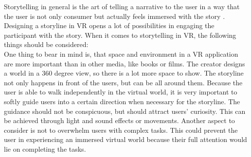 Storytelling in general is the art of telling a narrative to the user in a way that the user is not only consumer but actually feels immersed with the story \cite{Louden.2018}. Designing a storyline in VR opens a lot of possibilities in engaging the participant with the story. When it comes to storytelling in VR, the following things should be considered:\\
One thing to bear in mind is, that space and environment in a VR application are more important than in other media, like books or films. The creator designs a world in a 360 degree view, so there is a lot more space to show. The storyline not only happens in front of the users, but can be all around them. Because the user is able to walk independently in the virtual world, it is very important to softly guide users into a certain direction when necessary for the storyline. The guidance should not be conspicuous, but should attract  users' curiosity. This can be achieved through light and sound effects or movements. Another aspect to consider is not to overwhelm  users with complex tasks. This could prevent the user in experiencing an immersed virtual world because their full attention would lie on completing the tasks. \cite{Keane.2018}
